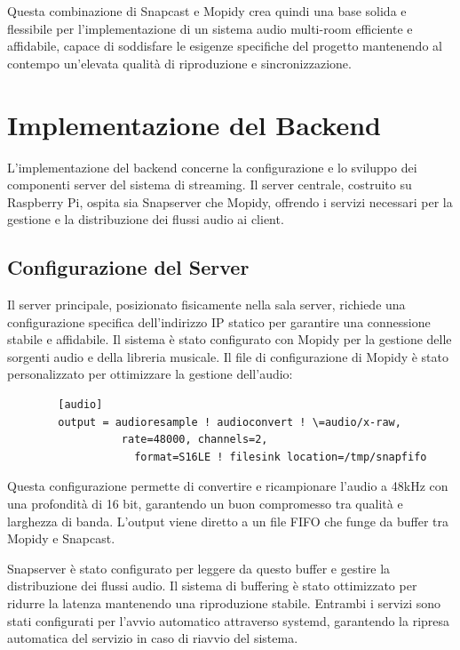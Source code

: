 Questa combinazione di Snapcast e Mopidy crea quindi una base solida e flessibile per l'implementazione di un sistema audio multi-room efficiente e affidabile, capace di soddisfare le esigenze specifiche del progetto mantenendo al contempo un'elevata qualità di riproduzione e sincronizzazione.

\section{Implementazione del Backend}
\noindent


L'implementazione del backend concerne la configurazione e lo sviluppo dei componenti server del sistema di streaming. Il server centrale, costruito su Raspberry Pi, ospita sia Snapserver che Mopidy, offrendo i servizi necessari per la gestione e la distribuzione dei flussi audio ai client.

\subsection{Configurazione del Server}

Il server principale, posizionato fisicamente nella sala server, richiede una configurazione specifica dell'indirizzo IP statico per garantire una connessione stabile e affidabile. Il sistema è stato configurato con Mopidy per la gestione delle sorgenti audio e della libreria musicale. Il file di configurazione di Mopidy è stato personalizzato per ottimizzare la gestione dell'audio:

\begin{table}[H]
    \begin{minipage}{0.8\textwidth}
      \begin{verbatim}
        [audio]
        output = audioresample ! audioconvert ! \=audio/x-raw,
                  rate=48000, channels=2,
                    format=S16LE ! filesink location=/tmp/snapfifo
      \end{verbatim}
    \end{minipage}
    \caption{Esempio di configurazione della pipeline audio di Mopidy.}
    \label{tab:mopidy_config}
  \end{table}

Questa configurazione permette di convertire e ricampionare l'audio a 48kHz con una profondità di 16 bit, garantendo un buon compromesso tra qualità e larghezza di banda. L'output viene diretto a un file FIFO che funge da buffer tra Mopidy e Snapcast.

Snapserver è stato configurato per leggere da questo buffer e gestire la distribuzione dei flussi audio. Il sistema di buffering è stato ottimizzato per ridurre la latenza mantenendo una riproduzione stabile. Entrambi i servizi sono stati configurati per l'avvio automatico attraverso systemd, garantendo la ripresa automatica del servizio in caso di riavvio del sistema.

